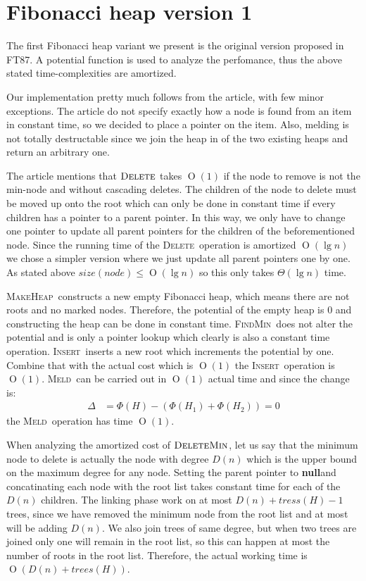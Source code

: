 \documentclass[oneside,11pt,openright]{report}
\newcommand{\BigO}[1]{\ensuremath{\operatorname{O}\left(#1\right)}}
\newcommand{\BigT}[1]{\ensuremath{\Theta\left(#1\right)}}
\newcommand{\MakeHeap}{\textsc{MakeHeap}}
\newcommand{\FindMin}{\textsc{FindMin}}
\newcommand{\Insert}{\textsc{Insert}}
\newcommand{\DeleteMin}{\textsc{DeleteMin}}
\newcommand{\Delete}{\textsc{Delete}}
\newcommand{\Meld}{\textsc{Meld}}
\newcommand{\NULL}{\textbf{null}}
\begin{document}
\section{Fibonacci heap version 1}

The first Fibonacci heap variant we present is the original version proposed in FT87. A potential function is used to analyze the perfomance, thus the above stated time-complexities are amortized.

Our implementation pretty much follows from the article, with few minor exceptions. The article do not specify exactly how a node is found from an item in constant time, so we decided to place a pointer on the item. Also, melding is not totally destructable since we join the heap in of the two existing heaps and return an arbitrary one. 

The article mentions that $\Delete$ takes $\BigO{1}$ if the node to remove is not the min-node and without cascading deletes. The children of the node to delete must be moved up onto the root which can only be done in constant time if every children has a pointer to a parent pointer. In this way, we only have to change one pointer to update all parent pointers for the children of the beforementioned node. Since the running time of the \Delete~operation is amortized $\BigO{\lg n}$ we chose a simpler version where we just update all parent pointers one by one. As stated above $size(node) \le \BigO{\lg n}$ so this only takes $\BigT{\lg n}$ time.

\MakeHeap~constructs a new empty Fibonacci heap, which means there are not roots and no marked nodes. Therefore, the potential of the empty heap is 0 and constructing the heap can be done in constant time. \FindMin~does not alter the potential and is only a pointer lookup which clearly is also a constant time operation. \Insert~inserts a new root which increments the potential by one. Combine that with the actual cost which is $\BigO{1}$ the \Insert~operation is $\BigO{1}$. \Meld~can be carried out in $\BigO{1}$ actual time and since the change is:
\begin{align*}
    \Delta & = \Phi(H) - (\Phi(H_1) + \Phi(H_2)) = 0
\end{align*}
the \Meld~operation has time $\BigO{1}$.

When analyzing the amortized cost of $\DeleteMin$, let us say that the minimum node to delete is actually the node with degree $D(n)$ which is the upper bound on the maximum degree for any node. Setting the parent pointer to \NULL and concatinating each node with the root list takes constant time for each of the $D(n)$ children. 
The linking phase work on at most $D(n) + tress(H) - 1$ trees, since we have removed the minimum node from the root list and at most will be adding $D(n)$. We also join trees of same degree, but when two trees are joined only one will remain in the root list, so this can happen at most the number of roots in the root list. Therefore, the actual working time is $\BigO{D(n) + trees(H)}$.
\end{document}
